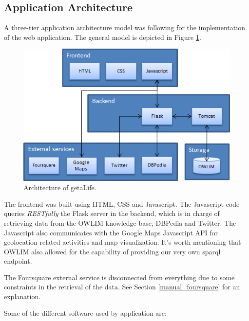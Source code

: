 \documentclass[hidelinks,a4paper]{article}
\begin{document}
\subsection{Application Architecture}

A three-tier application architecture model was following for the implementation of the web application. The general model is depicted in Figure \ref{fig:architecture}.

\begin{figure}[h!]
  \centering
    \includegraphics[scale=1.0]{images/architecture.png}    
    \caption{Architecture of getaLife.}
    \label{fig:architecture}
\end{figure}

The frontend was built using HTML, CSS and Javascript. The Javascript code queries \emph{RESTfully} the Flask server in the backend, which is in charge of retrieving data from the OWLIM knowledge base, DBPedia and Twitter. The Javascript also communicates with the Google Maps Javascript API for geolocation related activities and map visualization. It's worth mentioning that OWLIM also allowed for the capability of providing our very own sparql endpoint.

The Foursquare external service is disconnected from everything due to some constraints in the retrieval of the data. See Section \ref{manual_foursquare} for an explanation.

Some of the different software used by application are:
\end{document}
